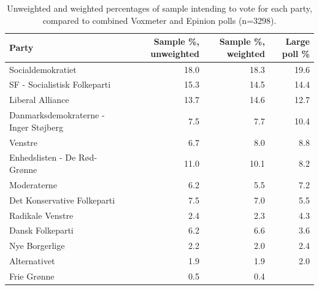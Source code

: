 \begin{table}[ht]
\centering
\begin{tabular}{lrrr}
  \hline
Party & Sample \%, unweighted & Sample \%, weighted & Large poll \% \\ 
  \hline
 Socialdemokratiet & 18.0 & 18.3 & 19.6 \\ 
   SF - Socialistisk Folkeparti & 15.3 & 14.5 & 14.4 \\ 
   Liberal Alliance & 13.7 & 14.6 & 12.7 \\ 
   Danmarksdemokraterne - Inger Støjberg & 7.5 & 7.7 & 10.4 \\ 
   Venstre & 6.7 & 8.0 & 8.8 \\ 
   Enhedslisten - De Rød-Grønne & 11.0 & 10.1 & 8.2 \\ 
   Moderaterne & 6.2 & 5.5 & 7.2 \\ 
   Det Konservative Folkeparti & 7.5 & 7.0 & 5.5 \\ 
   Radikale Venstre & 2.4 & 2.3 & 4.3 \\ 
   Dansk Folkeparti & 6.2 & 6.6 & 3.6 \\ 
   Nye Borgerlige & 2.2 & 2.0 & 2.4 \\ 
   Alternativet & 1.9 & 1.9 & 2.0 \\ 
   Frie Grønne & 0.5 & 0.4 &  \\ 
   \hline
\end{tabular}
\caption{Unweighted and weighted percentages of sample intending to vote for each
                   party, compared to combined Voxmeter and Epinion polls (n=3298).} 
\label{tab:votingintention}
\end{table}
